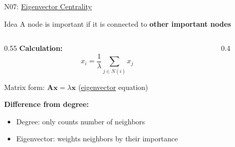 \documentclass[aspectratio=169, 10pt]{beamer}
\begin{document}
\begin{frame}{N07: \href{https://en.wikipedia.org/wiki/Eigenvector_centrality}{Eigenvector Centrality}}
    
    \begin{block}{Idea}
        A node is important if it is connected to \textbf{other important nodes}
    \end{block}
    
    \vspace{2mm}
    
    \begin{columns}
        \begin{column}{0.55\textwidth}
            \textbf{Calculation:}
            \[
            x_i = \frac{1}{\lambda} \sum_{j \in N(i)} x_j
            \]
            
            Matrix form: $\mathbf{Ax} = \lambda \mathbf{x}$ (\href{https://en.wikipedia.org/wiki/Eigenvalues_and_eigenvectors}{eigenvector} equation)
            
            \vspace{2mm}
            
            \textbf{Difference from degree:}
            \begin{itemize}
                \item Degree: only counts number of neighbors
                \item Eigenvector: weights neighbors by their importance
            \end{itemize}
        \end{column}
        
        \begin{column}{0.4\textwidth}
            \begin{center}
            \end{center}
            

\end{column}
\end{columns}
\end{frame}
\end{document}
